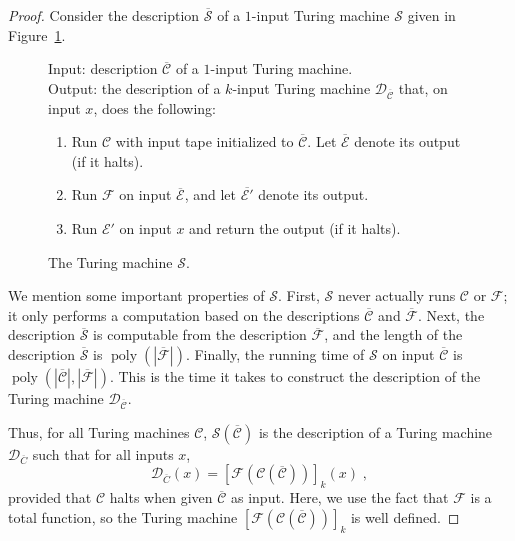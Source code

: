 \documentclass[11pt]{article}
\theoremstyle{definition}
\DeclareMathOperator{\poly}{poly}
\renewcommand{\cal}[1]{\mathcal{#1}}
\newenvironment{gamespec}{
  \begin{mdframed}[style=figstyle]}{
  \end{mdframed}}
\begin{document}
\begin{proof}
	
	Consider the description $\overline{\cal{S}}$ of a $1$-input Turing machine
  $\cal{S}$ given in Figure~\ref{fig:halt_s}.

  \begin{figure}[!htb]
    \centering
    \begin{gamespec}
      Input: description $\overline{\cal{C}}$ of a $1$-input Turing machine.
      \\[9pt]
      Output: the description of a $k$-input Turing machine
      $\cal{D}_{\overline{\cal{C}}}$ that, on input $x$, does the following:
      \begin{enumerate}
      \item Run $\cal{C}$ with input tape initialized to $\overline{\cal{C}}$. 
        Let $\overline{\cal{E}}$ denote its output (if it halts). 
		
      \item Run $\cal{F}$ on input $\overline{\cal{E}}$, and let
        $\overline{\cal{E}'}$ denote its output.
      \item Run $\cal{E}'$ on input $x$ and return the output (if it halts).
      \end{enumerate}
    \end{gamespec}
  \caption{The Turing machine $\cal{S}$.}
  \label{fig:halt_s}
\end{figure}

We mention some important properties of $\cal{S}$.
First, $\cal{S}$ never actually runs $\cal{C}$ or $\cal{F}$; it only performs a
computation based on the descriptions $\overline{\cal{C}}$ and
$\overline{\cal{F}}$.
Next, the description $\overline{\cal{S}}$ is computable from the description
$\overline{\cal{F}}$, and the length of the description $\overline{\cal{S}}$ is
$\poly(|\overline{\cal{F}}|)$.
Finally, the running time of $\cal{S}$ on input $\overline{\cal{C}}$ is
$\poly(|\overline{\cal{C}}|,|\overline{\cal{F}}|)$.
This is the time it takes to construct the description of the Turing machine
$\cal{D}_{\overline{\cal{C}}}$.

Thus, for all Turing machines $\cal{C}$, $\cal{S}(\overline{\cal{C}})$ is the
description of a Turing machine $\cal{D}_{\overline{C}}$ such that for all
inputs $x$,
\[
  \cal{D}_{\overline{C}}(x) =
  \left [ \cal{F}(\cal{C}(\overline{\cal{C}})) \right ]_k(x)\;,
\]
provided that $\cal{C}$ halts when given $\overline{\cal{C}}$ as input.
Here, we use the fact that $\cal{F}$ is a total function, so the Turing machine
$\left [ \cal{F}(\cal{C}(\overline{\cal{C}})) \right ]_k$ is well defined.
	

\end{proof}
\end{document}
